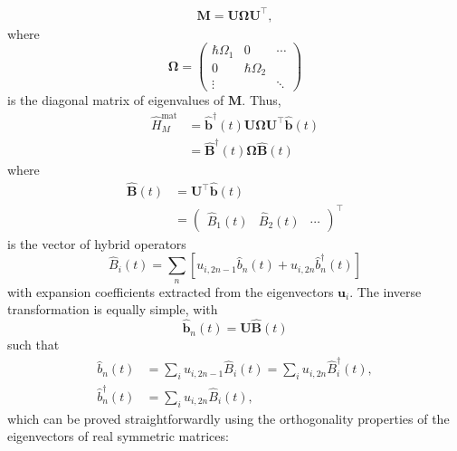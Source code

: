 \documentclass{article}
\begin{document}
\begin{equation}
\begin{split}
\mathbf{M} = \mathbf{U}\bm{\Omega}\mathbf{U}^\top,
\end{split}
\end{equation}
where
\begin{equation}
\bm{\Omega} = 
\begin{pmatrix}
\hbar\Omega_1 & 0 & \cdots\\
0 & \hbar\Omega_2 &\\
\vdots & & \ddots
\end{pmatrix}
\end{equation}
is the diagonal matrix of eigenvalues of $\mathbf{M}$. Thus, 
\begin{equation}
\begin{split}
\hat{H}_M^\mathrm{mat} &= \hat{\mathbf{b}}^\dagger(t)\mathbf{U}\bm{\Omega}\mathbf{U}^\top\hat{\mathbf{b}}(t)\\
&= \hat{\mathbf{B}}^\dagger(t)\bm{\Omega}\hat{\mathbf{B}}(t)
\end{split}
\end{equation}
where
\begin{equation}
\begin{split}
\hat{\mathbf{B}}(t) &= \mathbf{U}^\top\hat{\mathbf{b}}(t)\\
&= 
\begin{pmatrix}
\hat{B}_1(t) & \hat{B}_2(t) & \cdots
\end{pmatrix}^\top
\end{split}
\end{equation}
is the vector of hybrid operators
\begin{equation}
\hat{B}_i(t) = \sum_n\left[u_{i,2n-1}\hat{b}_n(t) + u_{i,2n}\hat{b}_n^\dagger(t)\right]
\end{equation}
with expansion coefficients extracted from the eigenvectors $\mathbf{u}_i$. The inverse transformation is equally simple, with
\begin{equation}
\hat{\mathbf{b}}_n(t) = \mathbf{U}\hat{\mathbf{B}}(t)
\end{equation}
such that
\begin{equation}
\begin{split}
\hat{b}_n(t) &= \sum_iu_{i,2n - 1}\hat{B}_i(t) = \sum_iu_{i,2n}\hat{B}_i^\dagger(t),\\
\hat{b}_n^\dagger(t) &= \sum_iu_{i,2n}\hat{B}_i(t),
\end{split}
\end{equation}
which can be proved straightforwardly using the orthogonality properties of the eigenvectors of real symmetric matrices:
\end{document}
